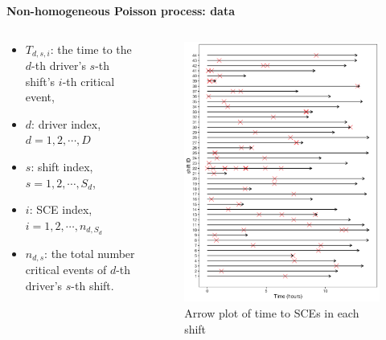 \documentclass[aspectratio=43]{beamer}
\begin{document}
\begin{frame}{\textbf{Non-homogeneous Poisson process: data}}
\begin{columns}
\begin{column}{.64\textwidth}
\begin{itemize}
\item $T_{d, s, i}$: the time to the $d$-th driver's $s$-th shift's $i$-th critical event,
\item $d$: driver index, $d = 1, 2, \cdots, D$
\item $s$: shift index, $s = 1, 2, \cdots, S_d$,
\item $i$: SCE index, $i = 1, 2, \cdots, n_{d, S_d}$
\item $n_{d,s}$: the total number critical events of $d$-th driver's $s$-th shift. 
\end{itemize}
\end{column}
\hfill
\begin{column}{.35\textwidth}
\begin{figure}
  \includegraphics[width=\textwidth]{Figures/t2events_arrow_plot.png}
  \caption{Arrow plot of time to SCEs in each shift}
\end{figure}
\end{column}
\end{columns}
\end{frame}
\end{document}
